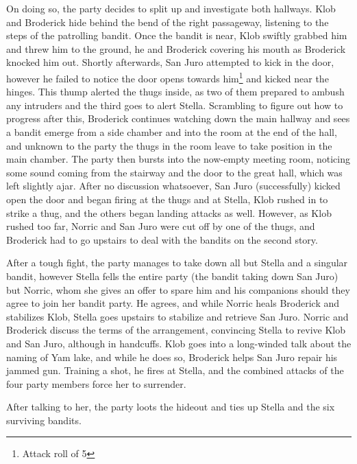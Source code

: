 On doing so, the party decides to split up and investigate both hallways. Klob and Broderick hide behind the bend of the right passageway, listening to the steps of the patrolling bandit. Once the bandit is near, Klob swiftly grabbed him and threw him to the ground, he and Broderick covering his mouth as Broderick knocked him out. Shortly afterwards, San Juro attempted to kick in the door, however he failed to notice the door opens towards him\footnote{Attack roll of 5} and kicked near the hinges. This thump alerted the thugs inside, as two of them prepared to ambush any intruders and the third goes to alert Stella. Scrambling to figure out how to progress after this, Broderick continues watching down the main hallway and sees a bandit emerge from a side chamber and into the room at the end of the hall, and unknown to the party the thugs in the room leave to take position in the main chamber. The party then bursts into the now-empty meeting room, noticing some sound coming from the stairway and the door to the great hall, which was left slightly ajar. After no discussion whatsoever, San Juro (successfully) kicked open the door and began firing at the thugs and at Stella, Klob rushed in to strike a thug, and the others began landing attacks as well. However, as Klob rushed too far, Norric and San Juro were cut off by one of the thugs, and Broderick had to go upstairs to deal with the bandits on the second story. 

After a tough fight, the party manages to take down all but Stella and a singular bandit, however Stella fells the entire party (the bandit taking down San Juro) but Norric, whom she gives an offer to spare him and his companions should they agree to join her bandit party. He agrees, and while Norric heals Broderick and stabilizes Klob, Stella goes upstairs to stabilize and retrieve San Juro. Norric and Broderick discuss the terms of the arrangement, convincing Stella to revive Klob and San Juro, although in handcuffs. Klob goes into a long-winded talk about the naming of Yam lake, and while he does so, Broderick helps San Juro repair his jammed gun. Training a shot, he fires at Stella, and the combined attacks of the four party members force her to surrender.

After talking to her, the party loots the hideout and ties up Stella and the six surviving bandits. 
